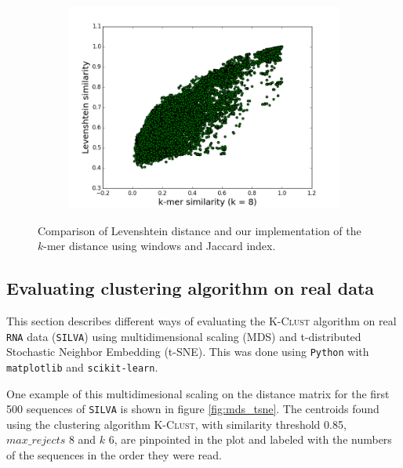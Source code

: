 \begin{figure}[H]
  \centering
  \begin{subfigure}[b]{0.5\textwidth}
    \includegraphics[scale=0.34]{graphics/k8.png}
  \end{subfigure}
  \caption{Comparison of Levenshtein distance and our implementation of the
  $k$-mer distance using windows and Jaccard index.}
  \label{fig:Levenshtein_vs_Kmer}
\end{figure}

\subsection{Evaluating clustering algorithm on real data}

This section describes different ways of evaluating the \textsc{K-Clust}
algorithm on real \texttt{RNA} data (\texttt{SILVA}) using multidimensional
scaling (MDS) and t-distributed Stochastic Neighbor Embedding (t-SNE). This was
done using \texttt{Python} with \texttt{matplotlib} and \texttt{scikit-learn}.

One example of this multidimesional scaling on the distance matrix for the
first 500 sequences of \texttt{SILVA} is shown in figure \ref{fig:mds_tsne}.
The centroids found using the clustering algorithm \textsc{K-Clust}, with
similarity threshold 0.85, $max\_rejects$ 8 and $k$ 6, are pinpointed in the
plot and labeled with the numbers of the sequences in the order they were read.

